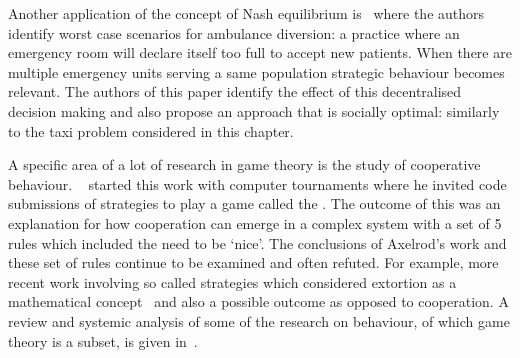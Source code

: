 Another application of the concept of Nash equilibrium
is~\cite{deo2011centralized} where the authors identify worst case
scenarios for ambulance diversion: a practice where an emergency room will
declare itself too full to accept new patients. When there are multiple emergency
units serving a same population strategic behaviour becomes relevant. The
authors of this paper identify the effect of this decentralised decision making
and also propose an approach that is socially optimal: similarly to the taxi
problem considered in this chapter.

A specific area of a lot of research in game theory is the study of cooperative 
behaviour. ~\cite{axelrod1990evolution} started this work with
computer tournaments where he invited code submissions of strategies to play a
game called the . The outcome of this was an
explanation for how cooperation can emerge in a complex system with a set of 5
rules which included the need to be `nice'. The conclusions of Axelrod's work and
these set of rules continue to be examined and often refuted. For example,
more recent work involving so called 
strategies which considered extortion as a mathematical
concept~\cite{press2012iterated} and also a possible outcome as opposed to
cooperation.
A review and systemic analysis of some of the research on behaviour, of which
game theory is a subset,
is given in~\cite{press2012iterated}.
